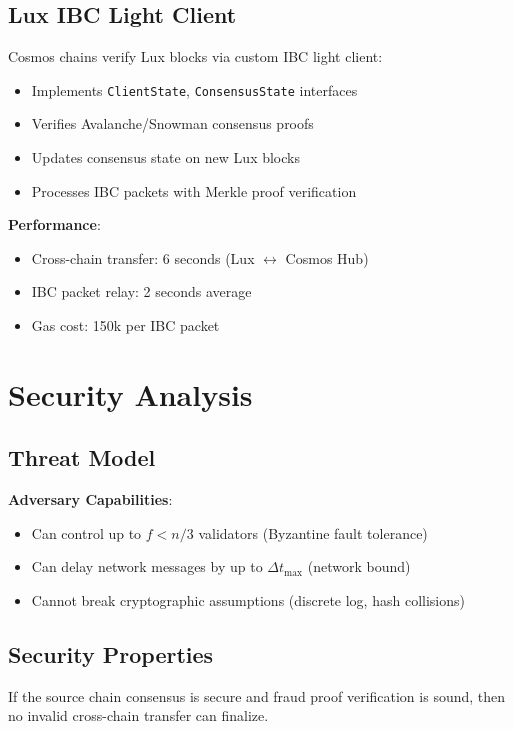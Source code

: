 \documentclass[11pt]{article}
\begin{document}
\subsection{Lux IBC Light Client}

Cosmos chains verify Lux blocks via custom IBC light client:
\begin{itemize}[leftmargin=1.1em]
  \item Implements \texttt{ClientState}, \texttt{ConsensusState} interfaces
  \item Verifies Avalanche/Snowman consensus proofs
  \item Updates consensus state on new Lux blocks
  \item Processes IBC packets with Merkle proof verification
\end{itemize}

\textbf{Performance}:
\begin{itemize}[leftmargin=1.1em]
  \item Cross-chain transfer: 6 seconds (Lux $\leftrightarrow$ Cosmos Hub)
  \item IBC packet relay: 2 seconds average
  \item Gas cost: 150k per IBC packet
\end{itemize}

\section{Security Analysis}

\subsection{Threat Model}

\textbf{Adversary Capabilities}:
\begin{itemize}[leftmargin=1.1em]
  \item Can control up to $f < n/3$ validators (Byzantine fault tolerance)
  \item Can delay network messages by up to $\Delta t_{\text{max}}$ (network bound)
  \item Cannot break cryptographic assumptions (discrete log, hash collisions)
\end{itemize}

\subsection{Security Properties}

\begin{theorem}
If the source chain consensus is secure and fraud proof verification is sound, then no invalid cross-chain transfer can finalize.
\end{theorem}
\end{document}
